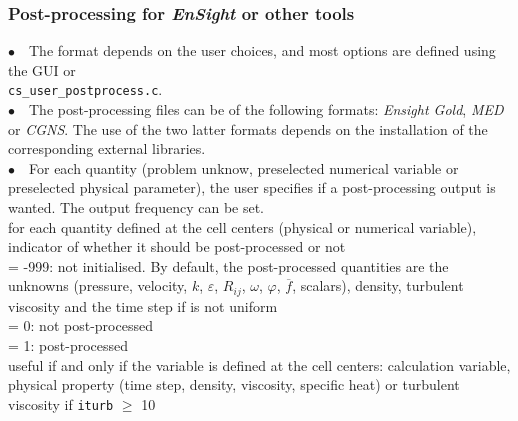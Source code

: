 \subsubsection{Post-processing for {\em EnSight} or other tools}

$\bullet\quad$The format depends on the user choices, and most options
are defined using the GUI or \\
\texttt{cs\_user\_postprocess.c}.\\
$\bullet\quad$The post-processing files can be of the following formats: {\em Ensight Gold},
{\em MED} or {\em CGNS}. The use of the two latter formats depends on
the installation of the corresponding external libraries.\\
$\bullet\quad$For each quantity (problem unknow, preselected numerical
variable or preselected physical parameter), the user specifies if a
post-processing output is wanted. The output frequency can be set.\\

{for each quantity defined at the cell centers (physical or numerical
variable), indicator of whether it should be post-processed or not \\
\hspace*{1.3cm}= -999: not initialised. By default, the post-processed
quantities are the unknowns (pressure, velocity, $k$, $\varepsilon$,
$R_{ij}$, $\omega$, $\varphi$, $\overline{f}$, scalars), density,
turbulent viscosity and the time step if is not uniform\\
\hspace*{1.3cm}= 0: not post-processed\\
\hspace*{1.3cm}= 1: post-processed\\
useful if and only if the variable is defined at the cell centers:
calculation variable, physical property (time step, density,
viscosity, specific heat) or turbulent viscosity if {\tt iturb}
$\geqslant$ 10}

